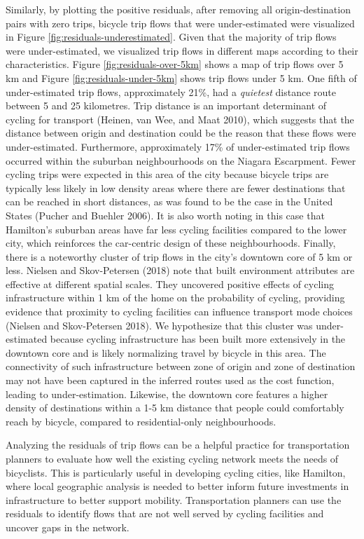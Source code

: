 \documentclass[smallextended]{svjour3}       %
\begin{document}
Similarly, by plotting the positive residuals, after removing all
origin-destination pairs with zero trips, bicycle trip flows that were
under-estimated were visualized in Figure
\ref{fig:residuals-underestimated}. Given that the majority of trip
flows were under-estimated, we visualized trip flows in different maps
according to their characteristics. Figure \ref{fig:residuals-over-5km}
shows a map of trip flows over 5 km and Figure
\ref{fig:residuals-under-5km} shows trip flows under 5 km. One fifth of
under-estimated trip flows, approximately 21\%, had a \emph{quietest}
distance route between 5 and 25 kilometres. Trip distance is an
important determinant of cycling for transport (Heinen, van Wee, and
Maat 2010), which suggests that the distance between origin and
destination could be the reason that these flows were under-estimated.
Furthermore, approximately 17\% of under-estimated trip flows occurred
within the suburban neighbourhoods on the Niagara Escarpment. Fewer
cycling trips were expected in this area of the city because bicycle
trips are typically less likely in low density areas where there are
fewer destinations that can be reached in short distances, as was found
to be the case in the United States (Pucher and Buehler 2006). It is
also worth noting in this case that Hamilton's suburban areas have far
less cycling facilities compared to the lower city, which reinforces the
car-centric design of these neighbourhoods. Finally, there is a
noteworthy cluster of trip flows in the city's downtown core of 5 km or
less. Nielsen and Skov-Petersen (2018) note that built environment
attributes are effective at different spatial scales. They uncovered
positive effects of cycling infrastructure within 1 km of the home on
the probability of cycling, providing evidence that proximity to cycling
facilities can influence transport mode choices (Nielsen and
Skov-Petersen 2018). We hypothesize that this cluster was
under-estimated because cycling infrastructure has been built more
extensively in the downtown core and is likely normalizing travel by
bicycle in this area. The connectivity of such infrastructure between
zone of origin and zone of destination may not have been captured in the
inferred routes used as the cost function, leading to under-estimation.
Likewise, the downtown core features a higher density of destinations
within a 1-5 km distance that people could comfortably reach by bicycle,
compared to residential-only neighbourhoods.

Analyzing the residuals of trip flows can be a helpful practice for
transportation planners to evaluate how well the existing cycling
network meets the needs of bicyclists. This is particularly useful in
developing cycling cities, like Hamilton, where local geographic
analysis is needed to better inform future investments in infrastructure
to better support mobility. Transportation planners can use the
residuals to identify flows that are not well served by cycling
facilities and uncover gaps in the network.
\end{document}
